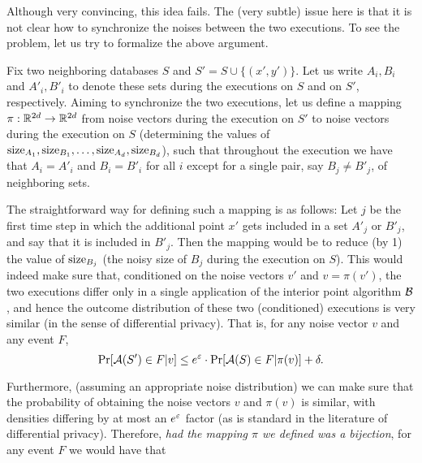 \documentclass[12pt,a4paper,oneside,onecolumn]{book}
\begin{document}
Although very convincing, this idea fails.
The (very subtle) issue here is that it is not clear how to synchronize the noises between the two executions. To see the problem, let us try to formalize the above argument.

Fix two neighboring databases $S$ and $S'=S\cup\{(x',y')\}$. Let us write $A_i,B_i$ and $A'_i,B'_i$ to denote these sets during the executions on $S$ and on $S'$, respectively.
Aiming to synchronize the two executions, let us define a mapping $\pi:\mathbb{R}^{2d}\rightarrow\mathbb{R}^{2d}$ from noise vectors during the execution on $S'$ to noise vectors during the execution on $S$ (determining the values of ${\rm size}_{A_1},{\rm size}_{B_1},\dots,{\rm size}_{A_d},{\rm size}_{B_d}$), such that throughout the execution we have that $A_i=A'_i$ and $B_i=B'_i$ for all $i$ except for a single pair, say $B_j\neq B'_j$, of neighboring sets.

The straightforward way for defining such a mapping is as follows: Let $j$ be the first time step in which the additional point $x'$ gets included in a set $A'_j$ or $B'_j$, and say that it is included in $B'_j$. Then the mapping would be to reduce (by 1) the value of ${\rm size}_{B_j}$ (the noisy size of $B_j$ during the execution on $S$). This would indeed make sure that, conditioned on the noise vectors $v'$ and $v=\pi(v')$, the two executions differ only in a single application of the interior point algorithm $\mathcal{B}$, and hence the outcome distribution of these two (conditioned) executions is very similar (in the sense of differential privacy). That is, for any noise vector $v$ and any event $F$,
$$
\Pr[\mathcal{A}(S')\in F | v] \leq e^{\varepsilon}\cdot \Pr[\mathcal{A}(S)\in F | \pi(v)] +\delta.
$$

Furthermore, (assuming an appropriate noise distribution) we can make sure that the probability of obtaining the noise vectors $v$ and $\pi(v)$ is similar, with densities differing by at most an $e^\varepsilon$ factor (as is standard in the literature of differential privacy). Therefore, {\em had the mapping $\pi$ we defined was a bijection}, for any event $F$ we would have that
\end{document}

